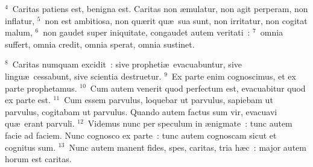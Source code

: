 ${}^{4}$~Caritas patiens est, benigna est. Caritas non \ae mulatur, non agit perperam, non inflatur,
${}^{5}$~non est ambitiosa, non qu\ae rit qu\ae\ sua sunt, non irritatur, non cogitat malum,
${}^{6}$~non gaudet super iniquitate, congaudet autem veritati~:
${}^{7}$~omnia suffert, omnia credit, omnia sperat, omnia sustinet.


${}^{8}$~Caritas numquam excidit~: sive propheti\ae\ evacuabuntur, sive lingu\ae\ cessabunt, sive scientia destruetur.
${}^{9}$~Ex parte enim cognoscimus, et ex parte prophetamus.
${}^{10}$~Cum autem venerit quod perfectum est, evacuabitur quod ex parte est.
${}^{11}$~Cum essem parvulus, loquebar ut parvulus, sapiebam ut parvulus, cogitabam ut parvulus. Quando autem factus sum vir, evacuavi qu\ae\ erant parvuli.
${}^{12}$~Videmus nunc per speculum in \ae nigmate~: tunc autem facie ad faciem. Nunc cognosco ex parte~: tunc autem cognoscam sicut et cognitus sum.
${}^{13}$~Nunc autem manent fides, spes, caritas, tria h\ae c~: major autem horum est caritas.

